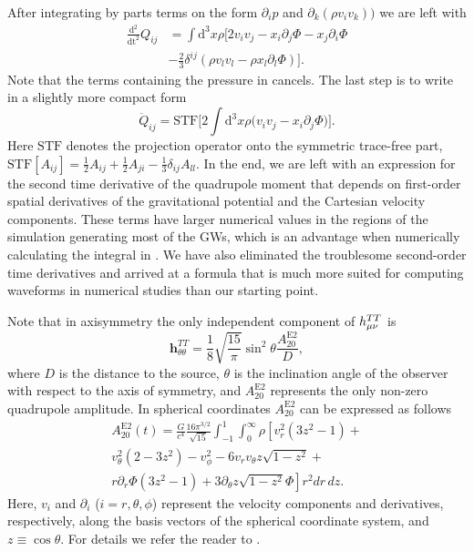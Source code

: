 After integrating by parts terms on the form $\partial_i p$ and $\partial_k (\rho v_i v_k))$
we are left with
\begin{align} \label{eqT:quaddtt3}
\frac{\mathrm{d}^2}{\mathrm{dt}^2} Q_{ij} & = \int \mathrm{d}^3 x \rho \bigg[ 2 v_i v_j  - x_i \partial_j \Phi -  x_j \partial_i \Phi \nonumber \\
&- \frac{2}{3} \delta^{ij} (\rho v_l v_l - \rho x_l \partial_l \Phi)  \bigg]. 
\end{align}
Note that the terms containing the pressure in  cancels. The last step is to write  in a slightly more 
compact form    
\begin{equation} \label{eqT:STFQ}
\ddot{Q}_{ij} =\mathrm{STF} \bigg[2 \int \mathrm{d}^3 x \rho \Big( v_i v_j - x_i \partial_j \Phi \Big) \bigg].
\end{equation}
Here $\mathrm{STF}$ denotes the projection operator
onto the symmetric trace-free part, $\mathrm{STF}[A_{ij}] = \frac{1}{2}A_{ij} + \frac{1}{2}A_{ji} - \frac{1}{3} \delta_{ij} A_{ll} $.
In the end, we are left with an expression for the second time derivative of the quadrupole moment that
depends on first-order spatial derivatives of the gravitational potential and the Cartesian velocity components.
These terms have larger numerical values in the regions of the simulation generating most of the GWs, which is an advantage when numerically calculating the integral in . We have also 
eliminated the troublesome second-order time derivatives and arrived at a formula that is much more suited for 
computing waveforms in numerical studies than our starting point.

Note that in axisymmetry the only independent component of $h_{\mu\nu}^{TT}$ is 
\begin{equation}
\mathbf{h}^{TT}_{\theta \theta} = \frac{1}{8}\sqrt{\frac{15}{\pi}} \sin^2{\theta} \frac{A_{20}^\mathrm{E2}}{D},
\end{equation}
where $D$ is the distance to the source, $\theta$ is the inclination angle of the observer with respect to the
axis of symmetry, and $A_{20}^\mathrm{E2}$ represents the only non-zero quadrupole amplitude.
In spherical coordinates $A_{20}^\mathrm{E2}$ can be expressed as follows
\begin{eqnarray} \label{eq:2dquad}
A_{20}^\mathrm{E2} (t) =  \frac{G}{c^4} \frac{16 \pi^{3/2}}{\sqrt{15}} \int_{-1}^{1}\int^{\infty}_0 \rho \left [ v_r^2(3 z^2 - 1)+ \right. \nonumber \\
v_{\theta}^2(2-3 z^2) - v_{\phi}^2 - 6 v_r v_{\theta} z\sqrt{1-z^2} + \nonumber \\
r \partial_r \Phi (3 z^2 - 1) +\left. 3 \partial_{\theta}z\sqrt{1-z^2} \Phi \right ]r^2 dr \, dz.
\end{eqnarray}
Here, $v_i$ and $\partial_i$ ($i = r, \theta, \phi$) represent the velocity components and derivatives, respectively, along
the basis vectors of the spherical coordinate system, and $z \equiv \cos \theta$.
For details we refer the reader to \cite{mueller_97}.

